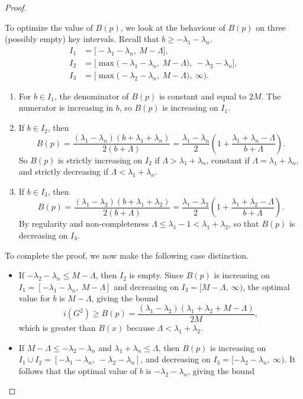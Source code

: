 \documentclass[10pt,a4paper]{amsart}
\theoremstyle{definition}
\begin{document}
\begin{proof}
\begin{itemize}
    To optimize the value of $B(p)$, we look at the behaviour of $B(p)$ on three (possibly empty) key intervals. Recall that $b \ge -\lambda_1-\lambda_n$.
    \begin{align*}
        I_1 &= \Big[-\lambda_1-\lambda_n,\ M-\Lambda\Big ],\\
        I_2 &= \Big [\max\big(-\lambda_1-\lambda_n,\ M-\Lambda\big),\ -\lambda_2-\lambda_n\Big ],\\
        I_3 &= \Big [ \max\big(-\lambda_2-
        \lambda_n,\ M-\Lambda\big),\ \infty \Big ).
    \end{align*}
    \begin{enumerate}
    \item For $b\in I_1$, the denominator of $B(p)$ is constant and equal to $2M$. The numerator is increasing in $b$, so $B(p)$ is increasing on $I_1$.
    \item If $b\in I_2$, then
    $$B(p)=\frac{(\lambda_1-\lambda_n)(b+\lambda_1+\lambda_n)}{2(b+\Lambda)}=\frac{\lambda_1-\lambda_n}{2}\left (1+\frac{\lambda_1+\lambda_n-\Lambda}{b+\Lambda}\right ).$$
    So $B(p)$ is strictly increasing on $I_2$ if $\Lambda>\lambda_1+\lambda_n$, constant if $\Lambda=\lambda_1+\lambda_n$, and strictly decreasing if $\Lambda< \lambda_1+\lambda_n$.
    \item If $b\in I_3$, then
    $$B(p)=\frac{(\lambda_1-\lambda_2)(b+\lambda_1+\lambda_2)}{2(b+\Lambda)}=\frac{\lambda_1-\lambda_2}2 \left (1+\frac{\lambda_1+\lambda_2-\Lambda}{b+\Lambda} \right).$$
    By regularity and non-completeness $\Lambda\le \lambda_1-1<\lambda_1+\lambda_2$, so that $B(p)$ is decreasing on $I_3$.
    \end{enumerate}
    To complete the proof, we now make the following case distinction.
    \begin{itemize}
        \item If $-\lambda_2-\lambda_n \le M-\Lambda$, then $I_2$ is empty. Since $B(p)$ is increasing on $I_1=[-\lambda_1-\lambda_n,\ M-\Lambda]$ and decreasing on $I_3=[M-\Lambda,\ \infty)$, the optimal value for $b$ is $M-\Lambda$, giving the bound
        $$i(G^2)\ge B(p) = \frac{(\lambda_1-\lambda_2)(\lambda_1+\lambda_2+M-\Lambda)}{2M},$$
        which is greater than $B(x)$ because $\Lambda <\lambda_1+\lambda_2$.
            \item If $M-\Lambda\le -\lambda_2-\lambda_n$ and $\lambda_1+\lambda_n \le \Lambda$, then $B(p)$ is increasing on $I_1\cup I_2=[-\lambda_1-\lambda_n,\ -\lambda_2-\lambda_n]$, and decreasing on $I_3=[-\lambda_2-\lambda_n,\ \infty)$. It follows that the optimal value of $b$ is $-\lambda_2-\lambda_n$, giving the bound

\end{itemize}
\end{itemize}
\end{proof}
\end{document}
